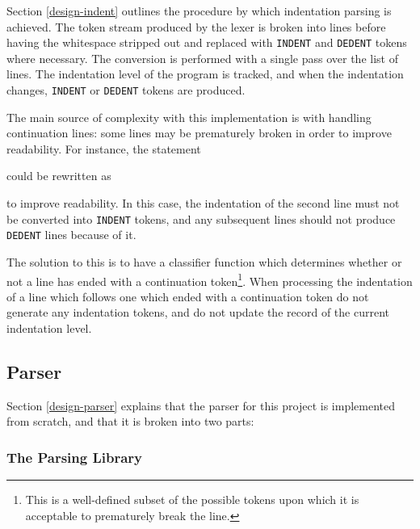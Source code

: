 Section \ref{design-indent} outlines the procedure by which indentation parsing
is achieved. The token stream produced by the lexer is broken into lines before
having the whitespace stripped out and replaced with \texttt{INDENT} and
\texttt{DEDENT} tokens where necessary. The conversion is performed with a
single pass over the list of lines. The indentation level of the program is
tracked, and when the indentation changes, \texttt{INDENT} or \texttt{DEDENT}
tokens are produced.

The main source of complexity with this implementation is with handling
continuation lines: some lines may be prematurely broken in order to improve
readability. For instance, the statement

could be rewritten as

to improve readability. In this case, the indentation of the second line must
not be converted into \texttt{INDENT} tokens, and any subsequent lines should
not produce \texttt{DEDENT} lines because of it.

The solution to this is to have a classifier function which determines whether
or not a line has ended with a continuation token\footnote{This is a
well-defined subset of the possible tokens upon which it is acceptable to
prematurely break the line.}. When processing the indentation of a line which
follows one which ended with a continuation token do not generate any
indentation tokens, and do not update the record of the current indentation
level.

\subsection{Parser}

Section \ref{design-parser} explains that the parser for this project is
implemented from scratch, and that it is broken into two parts:

\subsubsection{The Parsing Library}

